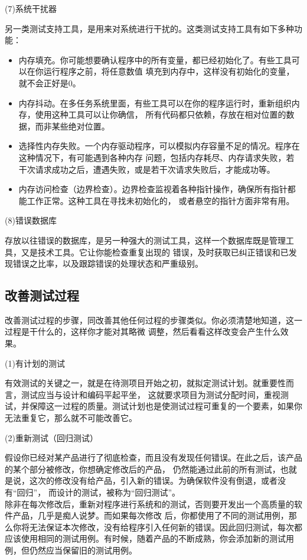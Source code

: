 \documentclass{article}
\begin{document}
\par
(7)系统干扰器
\par
另一类测试支持工具，是用来对系统进行干扰的。这类测试支持工具有如下多种功能：
\begin{itemize}
    \item 内存填充。你可能想要确认程序中的所有变量，都已经初始化了。有些工具可以在你运行程序之前，将任意数值
    填充到内存中，这样没有初始化的变量，就不会正好是0。
    \item 内存抖动。在多任务系统里面，有些工具可以在你的程序运行时，重新组织内存，使用这种工具可以让你确信，
    所有代码都只依赖，存放在相对位置的数据，而非某些绝对位置。
    \item 选择性内存失败。一个内存驱动程序，可以模拟内存容量不足的情况。程序在这种情况下，有可能遇到各种内存
    问题，包括内存耗尽、内存请求失败，若干次请求成功之后，遭遇失败，或是若干次请求失败后，才能成功等。
    \item 内存访问检查（边界检查）。边界检查监视着各种指针操作，确保所有指针都能工作正常。这种工具在寻找未初始化的，
    或者悬空的指针方面非常有用。
\end{itemize}

\par
(8)错误数据库
\par
存放以往错误的数据库，是另一种强大的测试工具，这样一个数据库既是管理工具，又是技术工具。它让你能检查重复出现的
错误，及时获取已纠正错误和已发现错误之比率，以及跟踪错误的处理状态和严重级别。

\subsection{改善测试过程}
改善测试过程的步骤，同改善其他任何过程的步骤类似。你必须清楚地知道，这一过程是干什么的，这样你才能对其略微
调整，然后看看这样改变会产生什么效果。
\par
(1)有计划的测试
\par
有效测试的关键之一，就是在待测项目开始之初，就拟定测试计划。就重要性而言，测试应当与设计和编码平起平坐，
这就要求项目为测试分配时间，重视测试，并保障这一过程的质量。测试计划也是使测试过程可重复的一个要素，如果你
无法重复它，那么就不可能改善它。

\par
(2)重新测试（回归测试）
\par
假设你已经对某产品进行了彻底检查，而且没有发现任何错误。在此之后，该产品的某个部分被修改，你想确定修改后的产品，
仍然能通过此前的所有测试，也就是说，这次的修改没有给产品，引入新的错误。为确保软件没有倒退，或者没有“回归”，
而设计的测试，被称为“回归测试”。\\
除非在每次修改后，重新对程序进行系统和的测试，否则要开发出一个高质量的软件产品，几乎是痴人说梦。而如果每次修改
后，你都使用了不同的测试用例，那么你将无法保证本次修改，没有给程序引入任何新的错误。因此回归测试，每次都
应该使用相同的测试用例。有时候，随着产品的不断成熟，你会添加新的测试用例，但仍然应当保留旧的测试用例。
\end{document}
